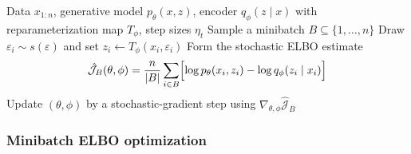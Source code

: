 \begin{algorithm}[H]
  \caption{Stochastic amortized VI with reparameterization}
  \label{alg:amortized-vi}
  \begin{algorithmic}[1]
    \Require Data $x_{1:n}$, generative model $p_\theta(x,z)$, encoder $q_\phi(z\mid x)$ with reparameterization map $T_\phi$, step sizes $\eta_t$
      \State Sample a minibatch $B\subseteq\{1,\dots,n\}$
        \State Draw $\varepsilon_i \sim s(\varepsilon)$ and set $z_i \gets T_\phi(x_i,\varepsilon_i)$
      \EndFor
      \State Form the stochastic ELBO estimate
      \[
        \hat{\mathcal{J}}_B(\theta,\phi)
        =
        \frac{n}{|B|}
        \sum_{i\in B}
        \Bigl[
          \log p_\theta(x_i,z_i)
          -
          \log q_\phi(z_i\mid x_i)
        \Bigr]
      \]
      \State Update $(\theta,\phi)$ by a stochastic-gradient step using $\nabla_{\theta,\phi}\hat{\mathcal{J}}_B$
    \EndFor
  \end{algorithmic}
\end{algorithm}

\subsubsection{Minibatch ELBO optimization}
\label{subsubsec:amortized-stochastic-gradients}

